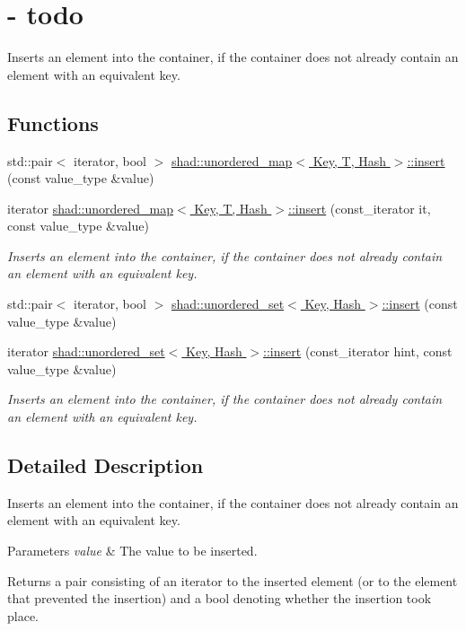 \hypertarget{group__Modifiers}{\section{-\/ todo}
\label{group__Modifiers}
}


Inserts an element into the container, if the container does not already contain an element with an equivalent key.  


\subsection*{Functions}
\begin{DoxyCompactItemize}
\item 
std\-::pair$<$ iterator, bool $>$ \hyperlink{group__Modifiers_gaca23a3638ad26f39038d7535b70b337d}{shad\-::unordered\-\_\-map$<$ Key, T, Hash $>$\-::insert} (const value\-\_\-type \&value)
\item 
iterator \hyperlink{group__Modifiers_ga93d0a1781c0b474b44ec1fccc691a6f2}{shad\-::unordered\-\_\-map$<$ Key, T, Hash $>$\-::insert} (const\-\_\-iterator it, const value\-\_\-type \&value)
\begin{DoxyCompactList}\small\item\em Inserts an element into the container, if the container does not already contain an element with an equivalent key. \end{DoxyCompactList}\item 
std\-::pair$<$ iterator, bool $>$ \hyperlink{group__Modifiers_ga094b72a3c1d24f3061565a5c92fd60e4}{shad\-::unordered\-\_\-set$<$ Key, Hash $>$\-::insert} (const value\-\_\-type \&value)
\item 
iterator \hyperlink{group__Modifiers_ga4364a63b4768ca4a4df2b497165fa0dc}{shad\-::unordered\-\_\-set$<$ Key, Hash $>$\-::insert} (const\-\_\-iterator hint, const value\-\_\-type \&value)
\begin{DoxyCompactList}\small\item\em Inserts an element into the container, if the container does not already contain an element with an equivalent key. \end{DoxyCompactList}\end{DoxyCompactItemize}


\subsection{Detailed Description}
Inserts an element into the container, if the container does not already contain an element with an equivalent key. 
\begin{DoxyParams}{Parameters}
{\em value} & The value to be inserted. \\
\hline
\end{DoxyParams}
\begin{DoxyReturn}{Returns}
a pair consisting of an iterator to the inserted element (or to the element that prevented the insertion) and a bool denoting whether the insertion took place. 
\end{DoxyReturn}


